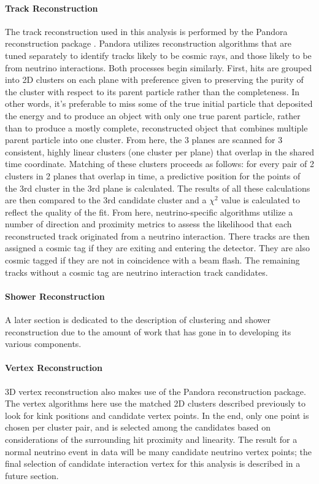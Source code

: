 \paragraph{Track Reconstruction}
The track reconstruction used in this analysis is performed by the Pandora reconstruction package \cite{bib:pandora}.  Pandora utilizes reconstruction algorithms that are tuned separately to identify tracks likely to be cosmic rays, and those likely to be from neutrino interactions. Both processes begin similarly.  First, hits are grouped into 2D clusters on each plane with preference given to preserving the purity of the cluster with respect to its parent particle rather than the completeness.  In other words, it's preferable to miss some of the true initial particle that deposited the energy and to produce an object with only one true parent particle, rather than to produce a mostly complete, reconstructed object that combines multiple parent particle into one cluster.  From here, the 3 planes are scanned for 3 consistent, highly linear clusters (one cluster per plane) that overlap in the shared time coordinate.  Matching of these clusters proceeds as follows:  for every pair of 2 clusters in 2 planes that overlap in time, a predictive position for the points of the 3rd cluster in the 3rd plane is calculated. The results of all these calculations are then compared to the 3rd candidate cluster and a $\chi^2$ value is calculated to reflect the quality of the fit. From here, neutrino-specific algorithms utilize a number of direction and proximity metrics to assess the likelihood that each reconstructed track originated from a neutrino interaction. There tracks are then assigned a cosmic tag if they are exiting and entering the detector.  They are also cosmic tagged if they are not in coincidence with a beam flash.  The remaining tracks without a cosmic tag are neutrino interaction track candidates.
\paragraph{Shower Reconstruction}
A later section is dedicated to the description of clustering and shower reconstruction due to the amount of work that has gone in to developing its various components.

\paragraph{Vertex Reconstruction}
3D vertex reconstruction also makes use of the Pandora reconstruction package. The vertex algorithms here use the matched 2D clusters described previously to look for kink positions and candidate vertex points. In the end, only one point is chosen per cluster pair, and is selected among the candidates based on considerations of the surrounding hit proximity and linearity. The result for a normal neutrino event in data will be many candidate neutrino vertex points; the final selection of candidate interaction vertex for this analysis is described in a future section.

